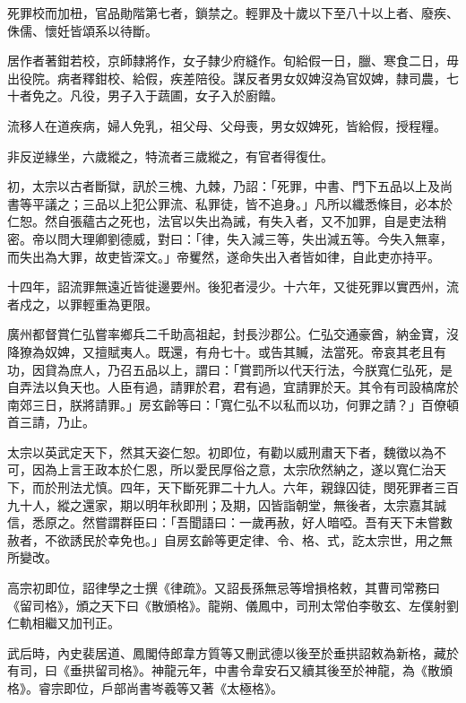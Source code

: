 \begin{pinyinscope}
 死罪校而加杻，官品勛階第七者，鎖禁之。輕罪及十歲以下至八十以上者、廢疾、侏儒、懷妊皆頌系以待斷。



 居作者著鉗若校，京師隸將作，女子隸少府縫作。旬給假一日，臘、寒食二日，毋出役院。病者釋鉗校、給假，疾差陪役。謀反者男女奴婢沒為官奴婢，隸司農，七十者免之。凡役，男子入于蔬圃，女子入於廚饎。



 流移人在道疾病，婦人免乳，祖父母、父母喪，男女奴婢死，皆給假，授程糧。



 非反逆緣坐，六歲縱之，特流者三歲縱之，有官者得復仕。



 初，太宗以古者斷獄，訊於三槐、九棘，乃詔：「死罪，中書、門下五品以上及尚書等平議之；三品以上犯公罪流、私罪徒，皆不追身。」凡所以纖悉條目，必本於仁恕。然自張蘊古之死也，法官以失出為誡，有失入者，又不加罪，自是吏法稍密。帝以問大理卿劉德威，對曰：「律，失入減三等，失出減五等。今失入無辜，而失出為大罪，故吏皆深文。」帝矍然，遂命失出入者皆如律，自此吏亦持平。



 十四年，詔流罪無遠近皆徙邊要州。後犯者浸少。十六年，又徙死罪以實西州，流者戍之，以罪輕重為更限。



 廣州都督賞仁弘嘗率鄉兵二千助高祖起，封長沙郡公。仁弘交通豪酋，納金寶，沒降獠為奴婢，又擅賦夷人。既還，有舟七十。或告其贓，法當死。帝哀其老且有功，因貸為庶人，乃召五品以上，謂曰：「賞罰所以代天行法，今朕寬仁弘死，是自弄法以負天也。人臣有過，請罪於君，君有過，宜請罪於天。其令有司設槁席於南郊三日，朕將請罪。」房玄齡等曰：「寬仁弘不以私而以功，何罪之請？」百僚頓首三請，乃止。



 太宗以英武定天下，然其天姿仁恕。初即位，有勸以威刑肅天下者，魏徵以為不可，因為上言王政本於仁恩，所以愛民厚俗之意，太宗欣然納之，遂以寬仁治天下，而於刑法尤慎。四年，天下斷死罪二十九人。六年，親錄囚徒，閔死罪者三百九十人，縱之還家，期以明年秋即刑；及期，囚皆詣朝堂，無後者，太宗嘉其誠信，悉原之。然嘗謂群臣曰：「吾聞語曰：一歲再赦，好人暗啞。吾有天下未嘗數赦者，不欲誘民於幸免也。」自房玄齡等更定律、令、格、式，訖太宗世，用之無所變改。



 高宗初即位，詔律學之士撰《律疏》。又詔長孫無忌等增損格敕，其曹司常務曰《留司格》，頒之天下曰《散頒格》。龍朔、儀鳳中，司刑太常伯李敬玄、左僕射劉仁軌相繼又加刊正。



 武后時，內史裴居道、鳳閣侍郎韋方質等又刪武德以後至於垂拱詔敕為新格，藏於有司，曰《垂拱留司格》。神龍元年，中書令韋安石又續其後至於神龍，為《散頒格》。睿宗即位，戶部尚書岑羲等又著《太極格》。




\end{pinyinscope}
